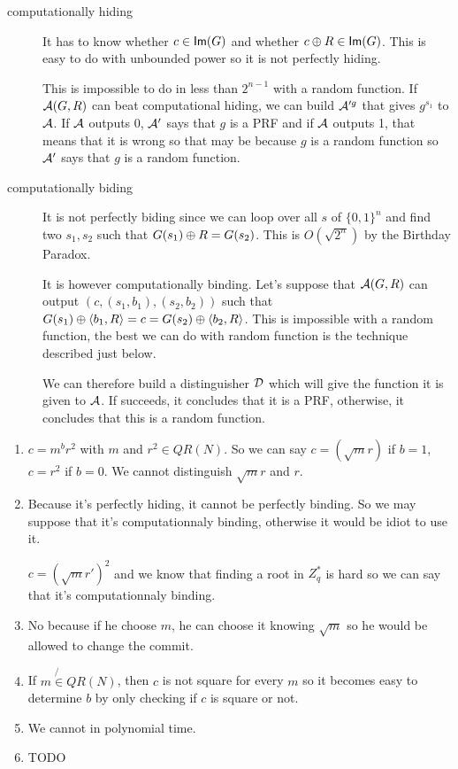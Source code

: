 \newape
\begin{solution}
  \begin{description}
    \item[computationally hiding]
      It has to know whether $c \in \operatorname{\mathsf{Im}}(G)$ and whether $c \oplus R \in \operatorname{\mathsf{Im}}(G)$.
      This is easy to do with unbounded power so it is not perfectly hiding.

      This is impossible to do in less than $2^{n-1}$ with a random function.
      If $\mathcal{A}(G,R)$ can beat computational hiding, we can build $\mathcal{A}'^g$ that gives $g^{s_1}$ to $\mathcal{A}$.
      If $\mathcal{A}$ outputs 0, $\mathcal{A}'$ says that $g$ is a PRF and if $\mathcal{A}$ outputs 1,
      that means that it is wrong so that may be because $g$ is a random function
      so $\mathcal{A}'$ says that $g$ is a random function.
    \item[computationally biding]
      It is not perfectly biding since we can loop over all $s$ of $\{0,1\}^n$ and find two $s_1,s_2$ such
      that $G(s_1) \oplus R = G(s_2)$.
      This is $O(\sqrt{2^n})$ by the Birthday Paradox.

      It is however computationally binding.
      Let's suppose that $\mathcal{A}(G,R)$ can output $(c, (s_1,b_1), (s_2, b_2))$ such that
      $G(s_1) \oplus \langle b_1,R \rangle = c = G(s_2) \oplus \langle b_2,R \rangle$.
      This is impossible with a random function, the best we can do with random function is the technique described just below.

      We can therefore build a distinguisher $\mathcal{D}$ which will give the function it is given to $\mathcal{A}$.
      If succeeds, it concludes that it is a PRF, otherwise, it concludes that this is a random function.
  \end{description}
\end{solution}

\begin{solution}
  \begin{enumerate}
    \item %
      $c = m^b r^2$ with $m$ and $r^2 \in QR(N)$. So we can say $c = (\sqrt{m}r)$ if $b = 1$, $c = r^2$ if $b = 0$. We cannot distinguish $\sqrt{m}r$ and $r$.
    \item  
      Because it's perfectly hiding, it cannot be perfectly binding. So we may suppose that it's computationnaly binding, otherwise it would be idiot to use it.
      
      $c = (\sqrt{m}r')^2$ and we know that finding a root in $Z^*_q$ is hard so we can say that it's computationnaly binding.
    \item
      No because if he choose $m$, he can choose it knowing $\sqrt{m}$ so he would be allowed to change the commit.
    \item
      If $m \not{\in} QR(N)$, then $c$ is not square for every $m$ so it becomes easy to determine $b$ by only checking if $c$ is square or not.
    \item
      We cannot in polynomial time.
    \item
      TODO
  \end{enumerate}
\end{solution}



